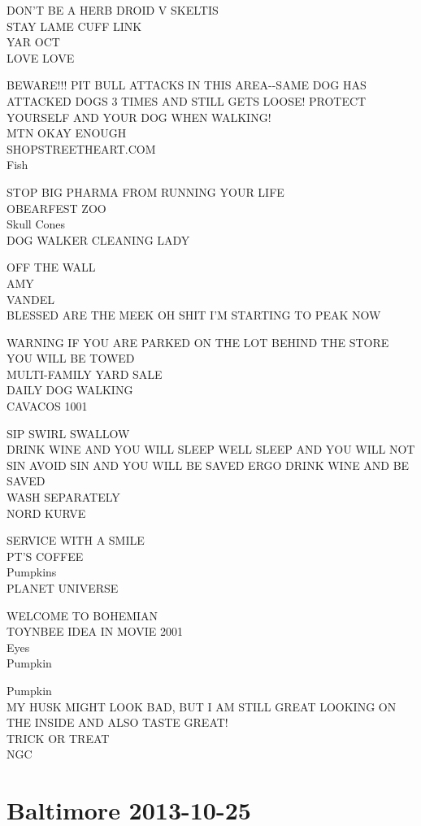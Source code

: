 \documentclass[10pt,letterpaper]{article}
\begin{document}
DON'T BE A HERB DROID V SKELTIS\\
STAY LAME CUFF LINK\\
YAR OCT\\
LOVE LOVE

BEWARE!!! PIT BULL ATTACKS IN THIS AREA{-}{-}SAME DOG HAS ATTACKED DOGS 3 TIMES AND STILL GETS LOOSE! PROTECT YOURSELF AND YOUR DOG WHEN WALKING!\\
MTN OKAY ENOUGH\\
SHOPSTREETHEART.COM\\
Fish

STOP BIG PHARMA FROM RUNNING YOUR LIFE\\
OBEARFEST ZOO\\
Skull Cones\\
DOG WALKER CLEANING LADY

OFF THE WALL\\
AMY\\
VANDEL\\
BLESSED ARE THE MEEK OH SHIT I'M STARTING TO PEAK NOW

WARNING IF YOU ARE PARKED ON THE LOT BEHIND THE STORE YOU WILL BE TOWED\\
MULTI{-}FAMILY YARD SALE\\
DAILY DOG WALKING\\
CAVACOS 1001

SIP SWIRL SWALLOW\\
DRINK WINE AND YOU WILL SLEEP WELL SLEEP AND YOU WILL NOT SIN AVOID SIN AND YOU WILL BE SAVED ERGO DRINK WINE AND BE SAVED\\
WASH SEPARATELY\\
NORD KURVE

SERVICE WITH A SMILE\\
PT'S COFFEE\\
Pumpkins\\
PLANET UNIVERSE

WELCOME TO BOHEMIAN\\
TOYNBEE IDEA IN MOVIE 2001\\
Eyes\\
Pumpkin

Pumpkin\\
MY HUSK MIGHT LOOK BAD, BUT I AM STILL GREAT LOOKING ON THE INSIDE AND ALSO TASTE GREAT!\\
TRICK OR TREAT\\
NGC


\section*{Baltimore 2013-10-25}
\end{document}
